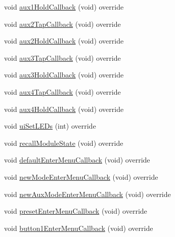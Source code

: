 \begin{DoxyCompactItemize}
\item 
void \mbox{\hyperlink{class_via_gateseq_1_1_via_gateseq_u_i_ac0a66889f6859802f3594031f81f05f3}{aux1\+Hold\+Callback}} (void) override
\item 
void \mbox{\hyperlink{class_via_gateseq_1_1_via_gateseq_u_i_a8e700657f1fe190238eca7c46541337b}{aux2\+Tap\+Callback}} (void) override
\item 
void \mbox{\hyperlink{class_via_gateseq_1_1_via_gateseq_u_i_a825cc56cdbeffd7eee887e8f189cb35d}{aux2\+Hold\+Callback}} (void) override
\item 
void \mbox{\hyperlink{class_via_gateseq_1_1_via_gateseq_u_i_a9bb95780740cd9fe650ba38aa3fb86a6}{aux3\+Tap\+Callback}} (void) override
\item 
void \mbox{\hyperlink{class_via_gateseq_1_1_via_gateseq_u_i_a5b18aa40706a39ed8878143d6911bc78}{aux3\+Hold\+Callback}} (void) override
\item 
void \mbox{\hyperlink{class_via_gateseq_1_1_via_gateseq_u_i_af12df5bd6d6bb9b069e8c410fcae7473}{aux4\+Tap\+Callback}} (void) override
\item 
void \mbox{\hyperlink{class_via_gateseq_1_1_via_gateseq_u_i_a98c59b4566672aeb522f6cafccd46b72}{aux4\+Hold\+Callback}} (void) override
\item 
void \mbox{\hyperlink{class_via_gateseq_1_1_via_gateseq_u_i_ab3eb51f8dcb036861e62c4456d726771}{ui\+Set\+L\+E\+Ds}} (int) override
\item 
void \mbox{\hyperlink{class_via_gateseq_1_1_via_gateseq_u_i_a4f3313685b65a93e1cd12e458dba34de}{recall\+Module\+State}} (void) override
\item 
void \mbox{\hyperlink{class_via_gateseq_1_1_via_gateseq_u_i_ad71d38b0b6b8c29e9f93e0fe6d2c40fc}{default\+Enter\+Menu\+Callback}} (void) override
\item 
void \mbox{\hyperlink{class_via_gateseq_1_1_via_gateseq_u_i_a7ced8ac998979d31b1f0a617edba8490}{new\+Mode\+Enter\+Menu\+Callback}} (void) override
\item 
void \mbox{\hyperlink{class_via_gateseq_1_1_via_gateseq_u_i_ad6fb8d3cdf019a290c82a9d42f3f83a7}{new\+Aux\+Mode\+Enter\+Menu\+Callback}} (void) override
\item 
void \mbox{\hyperlink{class_via_gateseq_1_1_via_gateseq_u_i_af0d1fcd037084b122f68ea1522080fd7}{preset\+Enter\+Menu\+Callback}} (void) override
\item 
void \mbox{\hyperlink{class_via_gateseq_1_1_via_gateseq_u_i_aa4ce0e46aeda7bea4ec2a09bbca2abac}{button1\+Enter\+Menu\+Callback}} (void) override
\item 

\end{DoxyCompactItemize}

